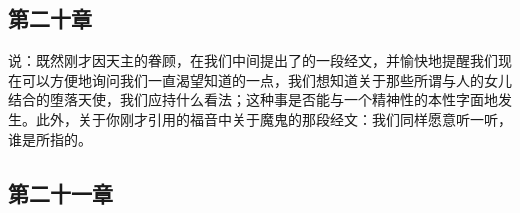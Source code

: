 
\subsection{第二十章\newline{}}

\par

说：既然刚才因天主的眷顾，在我们中间提出了的一段经文，并愉快地提醒我们现在可以方便地询问我们一直渴望知道的一点，我们想知道关于那些所谓与人的女儿结合的堕落天使，我们应持什么看法；这种事是否能与一个精神性的本性字面地发生。此外，关于你刚才引用的福音中关于魔鬼的那段经文：我们同样愿意听一听，谁是所指的。\par


\subsection{第二十一章\newline{}}

\par

